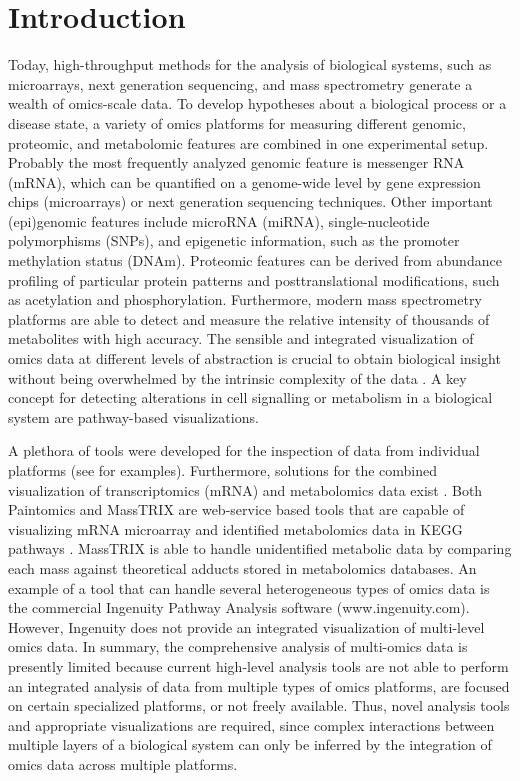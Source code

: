 \documentclass[final,5p,times,twocolumn]{elsarticle}
\begin{document}
\section{Introduction}
Today, high-throughput methods for the analysis of biological systems, such as microarrays, next generation sequencing, and mass spectrometry generate a wealth of omics-scale data. To develop hypotheses about a biological process or a disease state, a variety of omics platforms for measuring different genomic, proteomic, and metabolomic features are combined in one experimental setup. Probably the most frequently analyzed genomic feature is messenger RNA (mRNA), which can be quantified on a genome-wide level by gene expression chips (microarrays) or next generation sequencing techniques. Other important (epi)genomic features include microRNA (miRNA), single-nucleotide polymorphisms (SNPs), and epigenetic information, such as the promoter methylation status (DNAm). Proteomic features can be derived from abundance profiling of particular protein patterns and posttranslational modifications, such as acetylation and phosphorylation. Furthermore, modern mass spectrometry platforms are able to detect and measure the relative intensity of thousands of metabolites with high accuracy. The sensible and integrated visualization of omics data at different levels of abstraction is crucial to obtain biological insight without being overwhelmed by the intrinsic complexity of the data \cite{Gehlenborg2010}. A key concept for detecting alterations in cell signalling or metabolism in a biological system are pathway-based visualizations.

A plethora of tools were developed for the inspection of data from individual platforms (see \cite{Gehlenborg2010} for examples). Furthermore, solutions for the combined visualization of transcriptomics (mRNA) and metabolomics data exist \cite{Garcia-Alcalde2011,Waegele2012}. Both Paintomics \cite{Garcia-Alcalde2011} and MassTRIX \cite{Waegele2012} are web-service based tools that are capable of visualizing mRNA microarray and identified metabolomics data in KEGG pathways \cite{Kanehisa2012}. MassTRIX is able to handle unidentified metabolic data by comparing each mass against theoretical adducts stored in metabolomics databases. An example of a tool that can handle several heterogeneous types of omics data is the commercial Ingenuity Pathway Analysis software (www.ingenuity.com). However, Ingenuity does not provide an integrated visualization of multi-level omics data. In summary, the comprehensive analysis of multi-omics data is presently limited because current high-level analysis tools are not able to perform an integrated analysis of data from multiple types of omics platforms, are focused on certain specialized platforms, or not freely available. Thus, novel analysis tools and appropriate visualizations are required, since complex interactions between multiple layers of a biological system can only be inferred by the integration of omics data across multiple platforms.
\end{document}
